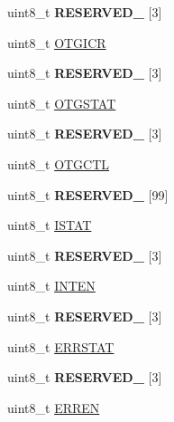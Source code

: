 \begin{DoxyCompactItemize}
uint8\+\_\+t {\bfseries R\+E\+S\+E\+R\+V\+E\+D\+\_} \mbox{[}3\mbox{]}
\item 
uint8\+\_\+t \hyperlink{struct_u_s_b___mem_map_a4cd829d73e01b3cf0a4fa9affedb210f}{O\+T\+G\+I\+CR}
\item 
\mbox{\label{struct_u_s_b___mem_map_a41df5454ebecece7ca24f330d3e76bcf}} 
uint8\+\_\+t {\bfseries R\+E\+S\+E\+R\+V\+E\+D\+\_} \mbox{[}3\mbox{]}
\item 
uint8\+\_\+t \hyperlink{struct_u_s_b___mem_map_a0398fe890efd8110f3d182e7fcb8a0c5}{O\+T\+G\+S\+T\+AT}
\item 
\mbox{\label{struct_u_s_b___mem_map_a9e2e1747e92f86edb0c8e9279c76c5ad}} 
uint8\+\_\+t {\bfseries R\+E\+S\+E\+R\+V\+E\+D\+\_} \mbox{[}3\mbox{]}
\item 
uint8\+\_\+t \hyperlink{struct_u_s_b___mem_map_a615eaa9b0200d66323e8ee2650a49164}{O\+T\+G\+C\+TL}
\item 
\mbox{\label{struct_u_s_b___mem_map_a369f01d9d4b8ac2f5aced9d041bca57e}} 
uint8\+\_\+t {\bfseries R\+E\+S\+E\+R\+V\+E\+D\+\_} \mbox{[}99\mbox{]}
\item 
uint8\+\_\+t \hyperlink{struct_u_s_b___mem_map_aa88345921ba963631cba089504b96c19}{I\+S\+T\+AT}
\item 
\mbox{\label{struct_u_s_b___mem_map_ab587ffb40eafb0bd3aaf062064d3b150}} 
uint8\+\_\+t {\bfseries R\+E\+S\+E\+R\+V\+E\+D\+\_} \mbox{[}3\mbox{]}
\item 
uint8\+\_\+t \hyperlink{struct_u_s_b___mem_map_aa19462850c5085330e53ed19397f6e1e}{I\+N\+T\+EN}
\item 
\mbox{\label{struct_u_s_b___mem_map_ae366f5847b944969f82b5cbd5cdc7da0}} 
uint8\+\_\+t {\bfseries R\+E\+S\+E\+R\+V\+E\+D\+\_} \mbox{[}3\mbox{]}
\item 
uint8\+\_\+t \hyperlink{struct_u_s_b___mem_map_ad86f18ee95df11168d4b6cf68578e0fa}{E\+R\+R\+S\+T\+AT}
\item 
\mbox{\label{struct_u_s_b___mem_map_ae1aee1d0c478ae6ee074f614670eafd7}} 
uint8\+\_\+t {\bfseries R\+E\+S\+E\+R\+V\+E\+D\+\_} \mbox{[}3\mbox{]}
\item 
uint8\+\_\+t \hyperlink{struct_u_s_b___mem_map_a810f265a9ad6dc0f51834d0cecf24a79}{E\+R\+R\+EN}

\end{DoxyCompactItemize}
